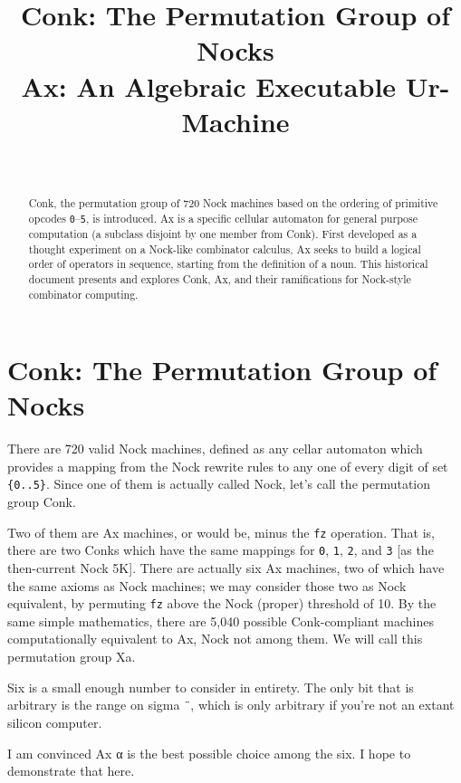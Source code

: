 \documentclass[twoside]{article}
\title{Conk:  The Permutation 
Group of Nocks \\ Ax:  An Algebraic Executable Ur-Machine}
\author{\authorname~\authorpatp \\ \affiliation}
\date{}
\begin{document}
\maketitle
\thispagestyle{firststyle}

\begin{abstract}
\sloppy
Conk, the permutation group of 720 Nock machines based on the ordering of primitive opcodes \texttt{0}--\texttt{5}, is \mbox{introduced}.  Ax is a specific cellular automaton for general purpose computation (a subclass disjoint by one member from Conk).  First developed as a thought experiment on a Nock-like combinator calculus, Ax seeks to build a logical order of operators in sequence, starting from the definition of a noun.  This historical document presents and explores Conk, Ax, and their ramifications for Nock-style combinator computing.
\end{abstract}

\setcounter{page}{191}

\tableofcontents

\section{Conk:  The Permutation Group of Nocks}

There are 720 valid Nock machines, defined as any cellar auto\-maton which provides a mapping from the Nock rewrite rules to any one of every digit of set \texttt{\{0..5\}}. Since one of them is actually called Nock, let's call the permutation group Conk.

Two of them are Ax machines, or would be, minus the \texttt{fz} operation. That is, there are two Conks which have the same mappings for \texttt{0}, \texttt{1}, \texttt{2}, and \texttt{3} [as the then-current Nock 5K]. There are actually six Ax machines, two of which have the same axioms as Nock machines; we may consider those two as Nock equivalent, by permuting \texttt{fz} above the Nock (proper) threshold of 10. By the same simple mathematics, there are 5,040 possible Conk-compliant machines computationally equivalent to Ax, Nock not among them. We will call this permutation group Xa. %

Six is a small enough number to consider in entirety. The only bit that is arbitrary is the range on sigma \texttt{¨}, which is only arbitrary if you're not an extant silicon computer.

I am convinced Ax α is the best possible choice among the six. I hope to demonstrate that here.
\end{document}
